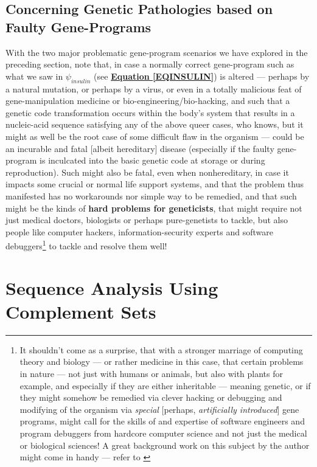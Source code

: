 \documentclass[a4paper, 18pt]{book} %
\begin{document}
\section{Concerning Genetic Pathologies based on Faulty Gene-Programs}

With the two major problematic gene-program scenarios we have explored in the preceding section, note that, in case a normally correct gene-program such as what we saw in $\psi_{insulin}$ (see \textbf{\hyperref[EQINSULIN]{Equation \ref{EQINSULIN}}}) is altered --- perhaps by a natural mutation, or perhaps by a virus, or even in a totally malicious feat of gene-manipulation medicine or bio-engineering/bio-hacking, and such that a genetic code transformation occurs within the body's system that results in a nucleic-acid sequence satisfying any of the above queer cases, who knows, but it might as well be the root case of some difficult flaw in the organism --- could be an incurable and fatal [albeit hereditary] disease (especially if the faulty gene-program is inculcated into the basic genetic code at storage or during reproduction). Such might also be fatal, even when nonhereditary, in case it impacts some crucial or normal life support systems, and that the problem thus manifested has no workarounds nor simple way to be remedied, and that such might be the kinds of \textbf{hard problems for geneticists}, that might require not just medical doctors, biologists or perhaps pure-genetists to tackle, but also people like computer hackers, information-security experts and software debuggers\footnote{It shouldn't come as a surprise, that with a stronger marriage of computing theory and biology --- or rather medicine in this case, that certain problems in nature --- not just with humans or animals, but also with plants for example, and especially if they are either inheritable --- meaning genetic, or if they might somehow be remedied via clever hacking or debugging and modifying of the organism via \textit{special} [perhaps, \textit{artificially introduced}] gene programs, might call for the skills of and expertise of software engineers and program debuggers from hardcore computer science and not just the medical or biological sciences! A great background work on this subject by the author might come in handy --- refer to \cite{Lutalo2025debug}} to tackle and resolve them well!



\chapter{Sequence Analysis Using Complement Sets}
\label{SEC3A}
\end{document}
